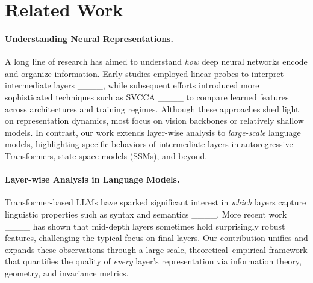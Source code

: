 \section{Related Work}
\label{sec:related}

\paragraph{Understanding Neural Representations.}


A long line of research has aimed to understand \emph{how} deep neural networks encode and organize information. Early studies employed linear probes to interpret intermediate layers ____, while subsequent efforts introduced more sophisticated techniques such as SVCCA ____ to compare learned features across architectures and training regimes. Although these approaches shed light on representation dynamics, most focus on vision backbones or relatively shallow models. In contrast, our work extends layer-wise analysis to \emph{large-scale} language models, highlighting specific behaviors of intermediate layers in autoregressive Transformers, state-space models (SSMs), and beyond.





\paragraph{Layer-wise Analysis in Language Models.}

Transformer-based LLMs have sparked significant interest in \emph{which} layers capture linguistic properties such as syntax and semantics ____. More recent work ____ has shown that mid-depth layers sometimes hold surprisingly robust features, challenging the typical focus on final layers. Our contribution unifies and expands these observations through a large-scale, theoretical--empirical framework that quantifies the quality of \emph{every} layer’s representation via information theory, geometry, and invariance metrics.



